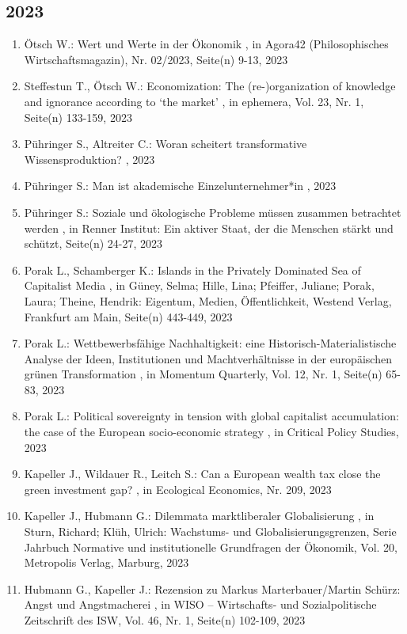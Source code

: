  \subsection*{2023} 
 \begin{enumerate}[leftmargin=*, labelsep=0.5cm] 
	 \item Ötsch W.:  Wert und Werte in der Ökonomik  , in Agora42 (Philosophisches Wirtschaftsmagazin), Nr. 02/2023, Seite(n) 9-13, 2023
	 \item Steffestun T., Ötsch W.:  Economization: The (re-)organization of knowledge and ignorance according to ‘the market’  , in ephemera, Vol. 23, Nr. 1, Seite(n) 133-159, 2023
	 \item Pühringer S., Altreiter C.:  Woran scheitert transformative Wissensproduktion?  , 2023
	 \item Pühringer S.:  Man ist akademische Einzelunternehmer*in  , 2023
	 \item Pühringer S.:  Soziale und ökologische Probleme müssen zusammen betrachtet werden  , in Renner Institut: Ein aktiver Staat, der die Menschen stärkt und schützt, Seite(n) 24-27, 2023
	 \item Porak L., Schamberger K.:  Islands in the Privately Dominated Sea of Capitalist Media  , in Güney, Selma; Hille, Lina; Pfeiffer, Juliane; Porak, Laura; Theine, Hendrik: Eigentum, Medien, Öffentlichkeit, Westend Verlag, Frankfurt am Main, Seite(n) 443-449, 2023
	 \item Porak L.:  Wettbewerbsfähige Nachhaltigkeit: eine Historisch-Materialistische Analyse der Ideen, Institutionen und Machtverhältnisse in der europäischen grünen Transformation  , in Momentum Quarterly, Vol. 12, Nr. 1, Seite(n) 65-83, 2023
	 \item Porak L.:  Political sovereignty in tension with global capitalist accumulation: the case of the European socio-economic strategy  , in Critical Policy Studies, 2023
	 \item Kapeller J., Wildauer R., Leitch S.:  Can a European wealth tax close the green investment gap?  , in Ecological Economics, Nr. 209, 2023
	 \item Kapeller J., Hubmann G.:  Dilemmata marktliberaler Globalisierung  , in Sturn, Richard; Klüh, Ulrich: Wachstums- und Globalisierungsgrenzen, Serie Jahrbuch Normative und institutionelle Grundfragen der Ökonomik, Vol. 20, Metropolis Verlag, Marburg, 2023
	 \item Hubmann G., Kapeller J.:  Rezension zu Markus Marterbauer/Martin Schürz: Angst und Angstmacherei  , in WISO – Wirtschafts- und Sozialpolitische Zeitschrift des ISW, Vol. 46, Nr. 1, Seite(n) 102-109, 2023

\end{enumerate}
